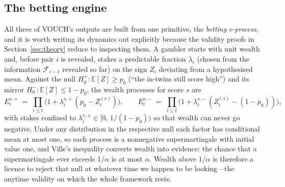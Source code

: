 \documentclass[pdflatex,sn-mathphys-num]{sn-jnl}
\theoremstyle{thmstyleone}
\theoremstyle{thmstyletwo}
\theoremstyle{thmstylethree}
\newcommand{\F}{\mathcal{F}}
\newcommand{\Efrak}{\mathbb{E}}
\begin{document}
\subsection{The betting engine}\label{sec:engine}

All three of VOUCH's outputs are built from one primitive, the \emph{betting
e-process}, and it is worth writing its dynamics out explicitly because the validity
proofs in Section~\ref{sec:theory} reduce to inspecting them. A gambler starts with
unit wealth and, before pair $i$ is revealed, stakes a predictable fraction
$\lambda_i$ (chosen from the information $\F_{i-1}$ revealed so far) on the sign
$Z_i$ deviating from a hypothesised mean. Against the null $H_0^{+}\colon
\Efrak[Z] \ge p_0$ (``the in-twins still score high'') and its mirror
$H_0^{-}\colon \Efrak[Z] \le 1-p_0$, the wealth processes for score $s$ are
\begin{equation}\label{eq:wealth}
E_t^{s,+} \;=\; \prod_{i \le t}\bigl(1 + \lambda_i^{s,+}\,(p_0 - Z_i^{(s)})\bigr),
\qquad
E_t^{s,-} \;=\; \prod_{i \le t}\bigl(1 + \lambda_i^{s,-}\,(Z_i^{(s)} - (1 - p_0))\bigr),
\end{equation}
with stakes confined to $\lambda_i^{s,\pm} \in [0,\, 1/(1-p_0))$ so that wealth can
never go negative. Under any distribution in the respective null each factor has
conditional mean at most one, so each process is a nonnegative supermartingale with
initial value one, and Ville's inequality converts wealth into evidence: the chance
that a supermartingale ever exceeds $1/\alpha$ is at most $\alpha$. Wealth above
$1/\alpha$ is therefore a licence to reject that null at whatever time we happen to be
looking---the anytime validity on which the whole framework rests.
\end{document}
